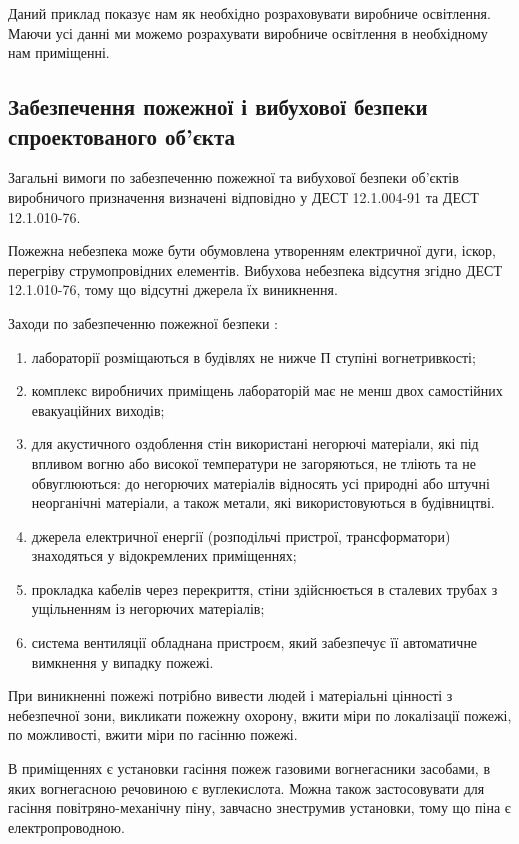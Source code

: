 Даний приклад показує нам як необхідно розраховувати виробниче освітлення. Маючи усі данні ми можемо розрахувати виробниче освітлення в необхідному нам приміщенні.

\subsection{Забезпечення пожежної і вибухової безпеки спроектованого 
 об'єкта}

Загальні вимоги по забезпеченню пожежної та вибухової безпеки об’єктів виробничого призначення визначені відповідно у ДЕСТ 12.1.004-91 та ДЕСТ 12.1.010-76.

Пожежна небезпека може бути обумовлена утворенням електричної дуги, іскор, перегріву струмопровідних елементів.
Вибухова небезпека відсутня згідно ДЕСТ 12.1.010-76, тому що відсутні джерела їх виникнення.

Заходи по забезпеченню пожежної безпеки :

\begin{enumerate}
 \item лабораторії розміщаються в будівлях не нижче П ступіні вогнетривкості;
 \item комплекс виробничих приміщень лабораторій має не менш двох самостійних евакуаційних виходів;
 \item для акустичного оздоблення стін використані негорючі матеріали, які під впливом вогню або високої температури не загоряються, не тліють та не обвуглюються: до негорючих матеріалів відносять усі природні або штучні неорганічні матеріали, а також метали, які використовуються в будівництві.
 \item джерела електричної енергії (розподільчі пристрої, трансформатори) знаходяться у відокремлених приміщеннях;
 \item прокладка кабелів через перекриття, стіни здійснюється в сталевих трубах з ущільненням із негорючих матеріалів;
 \item система вентиляції обладнана пристроєм, який забезпечує її автоматичне вимкнення у випадку пожежі.
\end{enumerate}

При виникненні пожежі потрібно вивести людей і матеріальні цінності з небезпечної зони, викликати пожежну охорону, вжити міри по локалізації пожежі, по можливості, вжити міри по гасінню пожежі.

В приміщеннях є установки гасіння пожеж газовими вогнегасники засобами, в яких вогнегасною речовиною є вуглекислота. Можна також застосовувати для гасіння повітряно-механічну піну, завчасно знеструмив установки, тому що піна є електропроводною. 

